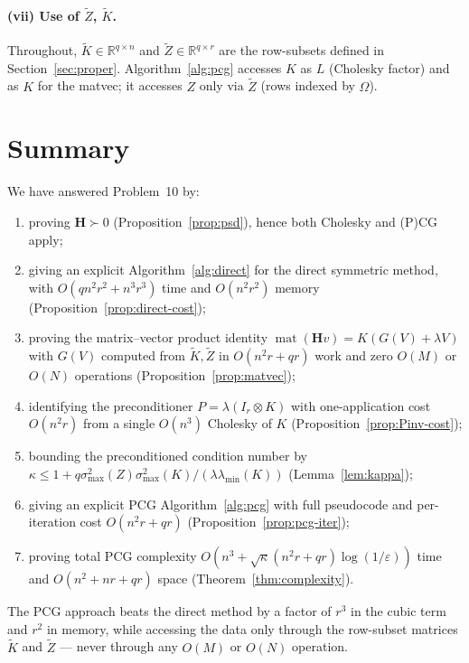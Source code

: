 \documentclass[12pt]{article}
\theoremstyle{definition}
\newcommand{\matop}{\operatorname{mat}}
\newcommand{\R}{\mathbb{R}}
\newcommand{\Kt}{\widetilde{K}}
\newcommand{\Zt}{\widetilde{Z}}
\begin{document}
\paragraph{(vii) Use of $\Zt$, $\Kt$.}
Throughout, $\Kt\in\R^{q\times n}$ and $\Zt\in\R^{q\times r}$ are the row-subsets defined in
Section~\ref{sec:proper}. Algorithm~\ref{alg:pcg} accesses $K$ as $L$ (Cholesky factor) and as
$K$ for the matvec; it accesses $Z$ only via $\Zt$ (rows indexed by $\Omega$). \checkmark

\section*{Summary}

We have answered Problem~10 by:
\begin{enumerate}
\item proving $\mathbf{H}\succ 0$ (Proposition~\ref{prop:psd}), hence both Cholesky and (P)CG
apply;
\item giving an explicit Algorithm~\ref{alg:direct} for the direct symmetric method, with
$O(qn^2r^2+n^3r^3)$ time and $O(n^2r^2)$ memory (Proposition~\ref{prop:direct-cost});
\item proving the matrix--vector product identity $\matop(\mathbf{H}v)=K(G(V)+\lambda V)$ with
$G(V)$ computed from $\Kt,\Zt$ in $O(n^2r+qr)$ work and zero $O(M)$ or $O(N)$ operations
(Proposition~\ref{prop:matvec});
\item identifying the preconditioner $P=\lambda(I_r\otimes K)$ with one-application cost
$O(n^2r)$ from a single $O(n^3)$ Cholesky of $K$ (Proposition~\ref{prop:Pinv-cost});
\item bounding the preconditioned condition number by
$\kappa\leq 1+q\sigma_{\max}^2(Z)\sigma_{\max}^2(K)/(\lambda\lambda_{\min}(K))$
(Lemma~\ref{lem:kappa});
\item giving an explicit PCG Algorithm~\ref{alg:pcg} with full pseudocode and per-iteration
cost $O(n^2r+qr)$ (Proposition~\ref{prop:pcg-iter});
\item proving total PCG complexity
$O(n^3+\sqrt{\kappa}(n^2r+qr)\log(1/\varepsilon))$ time and $O(n^2+nr+qr)$ space
(Theorem~\ref{thm:complexity}).
\end{enumerate}
The PCG approach beats the direct method by a factor of $r^3$ in the cubic term and $r^2$ in
memory, while accessing the data only through the row-subset matrices $\Kt$ and $\Zt$ — never
through any $O(M)$ or $O(N)$ operation.
\end{document}

